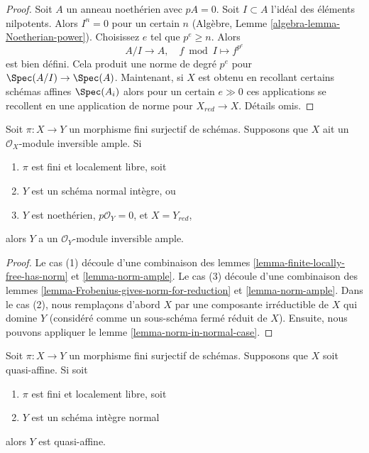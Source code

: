 \begin{proof}
Soit  $A$  un anneau noethérien avec  $pA = 0$. Soit  $I \subset A$ 
l'idéal des éléments nilpotents. Alors  $I^n = 0$  pour un certain  $n$ 
(Algèbre, Lemme  \ref{algebra-lemma-Noetherian-power}). Choisissez  $e$  tel que  $p^e \geq n$. Alors
$$
A/I \longrightarrow A,\quad
f \bmod I \longmapsto f^{p^e}
$$
est bien défini. Cela produit une norme de degré  $p^e$  pour  $\Spec(A/I) \to \Spec(A)$.
Maintenant, si  $X$  est obtenu en recollant certains schémas affines
 $\Spec(A_i)$  alors pour un certain  $e \gg 0$  ces applications se recollent en
une application de norme pour  $X_{red} \to X$. Détails omis.
\end{proof}

\begin{proposition}
\label{proposition-push-down-ample}
Soit  $\pi : X \to Y$  un morphisme fini surjectif de schémas. Supposons que
 $X$  ait un  $\mathcal{O}_X$-module inversible ample. Si
\begin{enumerate}
\item $\pi$  est fini et localement libre, soit
\item $Y$  est un schéma normal intègre, ou
\item $Y$  est noethérien,  $p\mathcal{O}_Y = 0$, et  $X = Y_{red}$,
\end{enumerate}
alors  $Y$  a un  $\mathcal{O}_Y$-module inversible ample.
\end{proposition}

\begin{proof}
Le cas (1) découle d'une combinaison des lemmes  \ref{lemma-finite-locally-free-has-norm}  et  \ref{lemma-norm-ample}. Le
cas (3) découle d'une combinaison des lemmes  \ref{lemma-Frobenius-gives-norm-for-reduction}  et  \ref{lemma-norm-ample}. Dans le
cas (2), nous remplaçons d'abord  $X$  par une composante irréductible de
 $X$  qui domine  $Y$  (considéré comme un sous-schéma fermé réduit
de  $X$). Ensuite, nous pouvons appliquer le lemme  \ref{lemma-norm-in-normal-case}.
\end{proof}

\begin{lemma}
\label{lemma-push-down-quasi-affine}
Soit  $\pi : X \to Y$  un morphisme fini surjectif de schémas. Supposons que
 $X$  soit quasi-affine. Si soit
\begin{enumerate}
\item $\pi$  est fini et localement libre, soit
\item $Y$  est un schéma intègre normal
\end{enumerate}
alors  $Y$  est quasi-affine.
\end{lemma}

